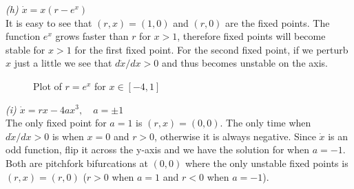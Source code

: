 \documentclass[12pt]{article}
\theoremstyle{remark}
\begin{document}
\newpage

\textit{(h) $\dot{x} = x(r - e^x)$} \\

It is easy to see that $(r,x) = (1,0)$ and $(r,0)$ are the fixed points. The function $e^x$ grows faster than $r$ for $x>1$, therefore fixed points will become stable for $x > 1$ for the first fixed point. For the second fixed point, if we perturb $x$ just a little we see that $d\dot{x}/dx > 0$ and thus becomes unstable on the axis.

\begin{figure}[H]
	\centering
	\caption{Plot of $r = e^x$ for $x \in [-4,1]$}
\end{figure}

\textit{(i) $\dot{x} = rx - 4ax^3, \quad a = \pm 1$} \\

The only fixed point for $a=1$ is $(r,x) = (0,0)$. The only time when $d\dot{x}/dx > 0$ is when $x=0$ and $r>0$, otherwise it is always negative. Since $\dot{x}$ is an odd function, flip it across the y-axis and we have the solution for when $a=-1$. Both are pitchfork bifurcations at $(0,0)$ where the only unstable fixed points is $(r,x) = (r,0)$ ($r>0$ when $a=1$ and $r<0$ when $a=-1$).
\end{document}
